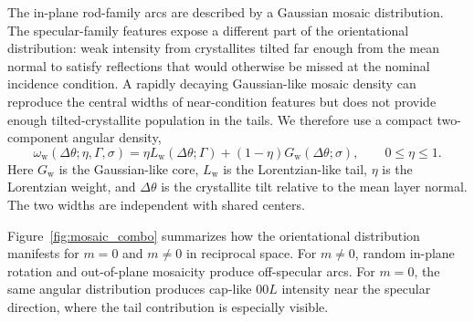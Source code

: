 The in-plane rod-family arcs are described by a Gaussian mosaic distribution. The specular-family features expose a different part of the orientational distribution: weak intensity from crystallites tilted far enough from the mean normal to satisfy reflections that would otherwise be missed at the nominal incidence condition. A rapidly decaying Gaussian-like mosaic density can reproduce the central widths of near-condition features but does not provide enough tilted-crystallite population in the tails. We therefore use a compact two-component angular density,
\begin{equation}
  \omega_{\mathrm w}(\Delta\theta;\eta,\Gamma,\sigma)
  =\eta L_{\mathrm w}(\Delta\theta;\Gamma)
  +(1-\eta)G_{\mathrm w}(\Delta\theta;\sigma),
  \qquad 0\le \eta \le 1 .
  \label{eq:mosaic_two_component_maintext}
\end{equation}
Here $G_{\mathrm w}$ is the Gaussian-like core, $L_{\mathrm w}$ is the Lorentzian-like tail, $\eta$ is the Lorentzian weight, and $\Delta\theta$ is the crystallite tilt relative to the mean layer normal. The two widths are independent with shared centers.

Figure~\ref{fig:mosaic_combo} summarizes how the orientational distribution manifests for \(m=0\) and \(m\neq 0\) in reciprocal space. For $m\neq0$, random in-plane rotation and out-of-plane mosaicity produce off-specular arcs. For $m=0$, the same angular distribution produces cap-like $00L$ intensity near the specular direction, where the tail contribution is especially visible.

